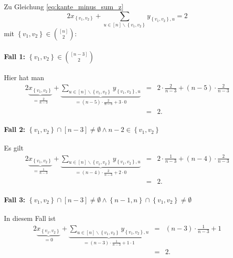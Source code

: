 \documentclass[10p,a4paper,BCOR = 12mm, DIV=15]{scrbook}
\begin{document}
\begin{bew}
Zu Gleichung \eqref{eq:kante_minus_sum_z} 
\begin{displaymath}
2 x_{\left\{v_1, v_2\right\}} + \sum_{u\in[n]\backslash\left\{v_1, v_2\right\}} y_{\left\{v_1, v_2\right\}, u} = 2
\end{displaymath}
mit $\left\{v_1, v_2\right\} \in {\left[n\right] \choose 2}$:

\paragraph{Fall 1: $\left\{v_1, v_2\right\} \in {\left[n-3\right] \choose 2}$} Hier hat man
\begin{eqnarray*}
2 \underbrace{x_{\left\{v_1, v_2\right\}}}_{= \frac{2}{n-3}} + \underbrace{\sum_{u\in[n]\backslash\left\{v_1, v_2\right\}} y_{\left\{v_1, v_2\right\}, u}}_{= \left(n-5\right) \cdot \frac{2}{n-3} + 3\cdot 0} & = & 2\cdot \frac{2}{n-3} + \left(n-5\right) \cdot \frac{2}{n-3} \\
& = & 2.
\end{eqnarray*}

\paragraph{Fall 2: $\left\{v_1, v_2\right\} \cap \left[n-3\right] \neq \emptyset \wedge n-2 \in \left\{v_1, v_2\right\}$} Es gilt
\begin{eqnarray*}
2 \underbrace{x_{\left\{v_1, v_2\right\}}}_{= \frac{1}{n-3}} + \underbrace{\sum_{u\in[n]\backslash\left\{v_1, v_2\right\}} y_{\left\{v_1, v_2\right\}, u}}_{= \left(n-4\right) \cdot \frac{2}{n-3} + 2\cdot 0} & = & 2\cdot \frac{1}{n-3} + \left(n-4\right) \cdot \frac{2}{n-3} \\
& = & 2.
\end{eqnarray*}

\paragraph{Fall 3: $\left\{v_1, v_2\right\} \cap \left[n-3\right] \neq \emptyset \wedge \left\{n-1, n\right\} \cap \left\{v_1, v_2\right\} \neq \emptyset$} In diesem Fall ist
\begin{eqnarray*}
2 \underbrace{x_{\left\{v_1, v_2\right\}}}_{= 0} + \underbrace{\sum_{u\in[n]\backslash\left\{v_1, v_2\right\}} y_{\left\{v_1, v_2\right\}, u}}_{= \left(n-3\right) \cdot \frac{1}{n-3} + 1\cdot 1} & = & \left(n-3\right) \cdot \frac{1}{n-3} + 1 \\
& = & 2.
\end{eqnarray*}


\end{bew}
\end{document}
